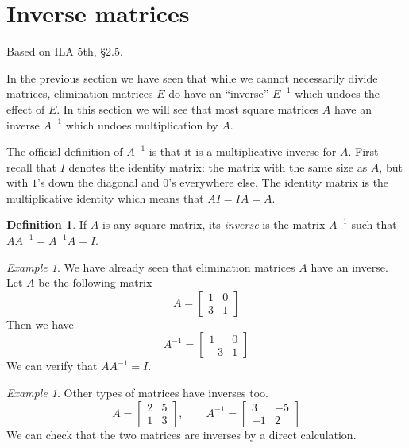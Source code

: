 \documentclass[11pt,oneside]{amsbook}
\theoremstyle{definition}
\theoremstyle{plain}
\theoremstyle{definition}
\newtheorem{definition}[theorem]{Definition}
\theoremstyle{remark}
\newtheorem{example}[theorem]{Example}
\numberwithin{equation}{section}
\numberwithin{figure}{section}
\begin{document}
\newpage
\section{Inverse matrices}

Based on ILA 5th, \S 2.5.

In the previous section we have seen that while we cannot necessarily divide matrices, elimination matrices $E$ do have an ``inverse'' $E^{-1}$ which undoes the effect of $E$. In this section we will see that most square matrices $A$ have an inverse $A^{-1}$ which undoes multiplication by $A$.

The official definition of $A^{-1}$ is that it is a multiplicative inverse for $A$. First recall that $I$ denotes the identity matrix: the matrix with the same size as $A$, but with $1$'s down the diagonal and $0$'s everywhere else. The identity matrix is the multiplicative identity which means that $AI=IA=A$.

\begin{definition}
  If $A$ is any square matrix, its \emph{inverse} is the matrix $A^{-1}$ such that $AA^{-1}=A^{-1}A=I$.
\end{definition}

\begin{example}
  We have already seen that elimination matrices $A$ have an inverse. Let $A$ be the following matrix
  \[A=\begin{bmatrix}1&0\\3&1\end{bmatrix}
  \]
  Then we have
  \[A^{-1}=\begin{bmatrix}1&0\\-3&1\end{bmatrix}
  \]
  We can verify that $AA^{-1}=I$.
\end{example}

\begin{example}
  Other types of matrices have inverses too.
  \[A=\begin{bmatrix}2&5\\1&3\end{bmatrix},\qquad
    A^{-1}=\begin{bmatrix}3&-5\\-1&2\end{bmatrix}
  \]
  We can check that the two matrices are inverses by a direct calculation.
\end{example}
\end{document}

